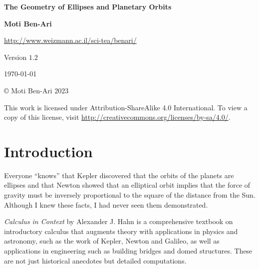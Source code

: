 


\thispagestyle{empty}

\begin{center}
\textbf{\LARGE The Geometry of Ellipses and Planetary Orbits}

\bigskip
\bigskip
\bigskip

\textbf{\Large Moti Ben-Ari}

\bigskip

\url{http://www.weizmann.ac.il/sci-tea/benari/}

\bigskip
\bigskip
\bigskip

Version $1.2$

\bigskip

\today

\end{center}

\vfill

\begin{center}
\copyright{} Moti Ben-Ari $2023$
\end{center}
 
\begin{small}
This work is licensed under Attribution-ShareAlike 4.0 International. To view a copy of this license, visit \url{http://creativecommons.org/licenses/by-sa/4.0/}.
\end{small}

\newpage

\tableofcontents

\newpage


\chapter{Introduction}

Everyone ``knows'' that Kepler discovered that the orbits of the planets are ellipses and that Newton showed that an elliptical orbit implies that the force of gravity must be inversely proportional to the square of the distance from the Sun. Although I knew these facts, I had never seen them demonstrated.

\textit{Calculus in Context} \cite{hahn-cic} by Alexander J. Hahn is a comprehensive textbook on introductory calculus that augments theory with  applications in physics and astronomy, such as the work of Kepler, Newton and Galileo, as well as applications in engineering such as building bridges and domed structures. These are not just historical anecdotes but detailed computations.

